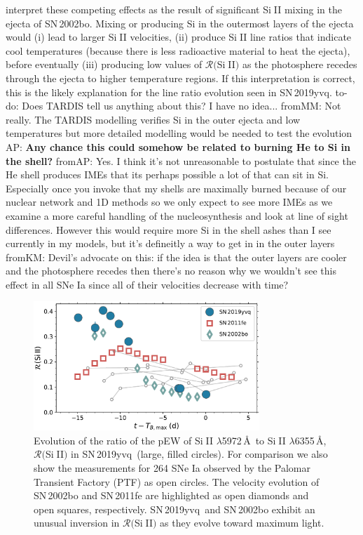 \documentclass[twocolumn]{aastex63}
\def\ion#1#2{#1$\;${\footnotesize\rm{#2}}\relax}
\newcommand{\abi}[1]{{\color{LincolnGreen} AP: \textbf{#1}}}
\newcommand{\fromkate}[1]{{\color{brown} fromKM: {#1}}}
\newcommand{\frommark}[1]{{\color{orange} fromMM: {#1}}}
\newcommand{\fromabi}[1]{{\color{teal} fromAP: {#1}}}
\newcommand{\todo}[1]{{\color{magenta} to-do: {#1}}}
\newcommand{\sn}{SN\,2019yvq}
\begin{document}
\citet{Benetti04} interpret these competing effects as the result of
significant \ion{Si}{II} mixing in the ejecta of SN\,2002bo. Mixing or
producing Si in the outermost layers of the ejecta would (i) lead to larger
\ion{Si}{II} velocities, (ii) produce \ion{Si}{II} line ratios that indicate
cool temperatures (because there is less radioactive material to heat the
ejecta), before eventually (iii) producing low values of
$\mathcal{R}($\ion{Si}{II}$)$ as the photosphere recedes through the ejecta to
higher temperature regions. If this interpretation is correct, this is the
likely explanation for the line ratio evolution seen in \sn. \todo{Does TARDIS
tell us anything about this? I have no idea...} \frommark{Not really. The TARDIS modelling verifies Si in the outer ejecta and low temperatures but more detailed modelling would be needed to test the evolution} \abi{Any chance this could
somehow be related to burning He to Si in the shell?} \fromabi{Yes. I think it's not unreasonable to postulate that since the He shell produces IMEs that its perhaps possible a lot of that can sit in Si. Especially once you invoke that my shells are maximally burned because of our nuclear network and 1D methods so we only expect to see more IMEs as we examine a more careful handling of the nucleosynthesis and look at line of sight differences. However this would require more Si in the shell ashes than I see currently in my models, but it's defineitly a way to get in in the outer layers} \fromkate{Devil's
advocate on this: if the idea is that the outer layers are cooler and the
photosphere recedes then there's no reason why we wouldn't see this effect in
all SNe Ia since all of their velocities decrease with time? }

\begin{figure}
    \centering
    \includegraphics[width=3.35in]{./figures/R_evolution.pdf}
    \caption{Evolution of the ratio of the pEW of \ion{Si}{II}
    $\lambda$5972\,\AA\ to \ion{Si}{II} $\lambda$6355\,\AA,
    $\mathcal{R}($\ion{Si}{II}$)$ in \sn\ (large, filled circles). For
    comparison we also show the measurements for 264 SNe Ia observed by the
    Palomar Transient Factory (PTF) as open circles. The velocity evolution
    of SN\,2002bo and SN\,2011fe are highlighted as open diamonds and open
    squares, respectively. \sn\ and SN\,2002bo exhibit an unusual inversion
    in $\mathcal{R}($\ion{Si}{II}$)$ as they evolve toward maximum light.}
    \label{fig:r_evo}
\end{figure}
\end{document}
